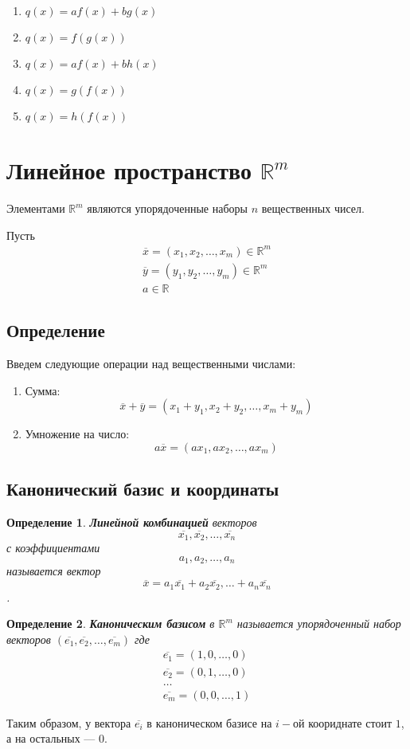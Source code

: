 \documentclass[]{article}
\newtheorem{definition}{Определение}
\begin{document}
	\begin{enumerate}
		\item $q(x)=af(x)+bg(x)$
		\item $q(x)=f(g(x))$
		\item $q(x)=af(x)+bh(x)$
		\item $q(x)=g(f(x))$
		\item $q(x)=h(f(x))$
	\end{enumerate}
	
	\section{Линейное пространство $\mathbb{R}^m$}
	
	Элементами $\mathbb{R}^m$ являются упорядоченные наборы $n$ вещественных чисел.
	
	Пусть \begin{gather*}
		\overline{x}=(x_1, x_2, \ldots, x_m)\in \mathbb{R}^m 
		\\
		\overline{y}=(y_1, y_2, \ldots, y_m)\in \mathbb{R}^m 
		\\
		a\in \mathbb{R}
	\end{gather*}
	\subsection{Определение}
	Введем следующие операции над вещественными числами:\begin{enumerate}
		\item Сумма: $$\overline{x}+\overline{y}=
		(x_1+y_1, x_2+y_2, \ldots, x_m+y_m)$$
		\item Умножение на число: $$a\overline{x}=
		(ax_1, ax_2, \ldots, ax_m)$$
	\end{enumerate}
	
	
	\subsection{Канонический базис и координаты}
	\begin{definition}
		\textbf{Линейной комбинацией} векторов 
		$$
		\overline{x_1}, \overline{x_2},\ldots, \overline{x_n}
		$$
		с коэффициентами 
		$$
		a_1,a_2,\ldots, a_n
		$$
		называется вектор $$\overline{x}=a_1\overline{x_1}+ a_2\overline{x_2},\ldots+ a_n\overline{x_n}$$.
	\end{definition}
	
	\begin{definition}
		\textbf{Каноническим базисом} в $\mathbb{R}^m$ называется упорядоченный набор векторов $(\overline{e_1}, \overline{e_2}, \ldots, \overline{e_m})$ где
		\begin{gather*}
			\overline{e_1} = (1,0,\ldots,0)
			\\
			\overline{e_2} = (0,1,\ldots,0)
			\\
			\ldots
			\\
			\overline{e_m} = (0,0,\ldots,1)
		\end{gather*}
	\end{definition}
	Таким образом, у вектора $\overline{e_i}$ в каноническом базисе на $i-$ой коориднате стоит $1$, а на остальных --- $0$.
	
\end{document}
